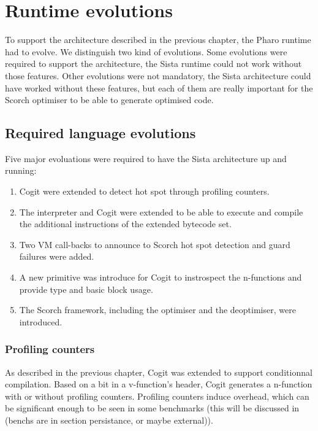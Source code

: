 \documentclass[a4paper,12pt,twoside]{../includes/ThesisStyle}
\begin{document}
\fi

\chapter{Runtime evolutions}
\label{chap:runtimeEvolution}
\minitoc

To support the architecture described in the previous chapter, the Pharo runtime had to evolve. We distinguish two kind of evolutions. Some evolutions were required to support the architecture, the Sista runtime could not work without those features. Other evolutions were not mandatory, the Sista architecture could have worked without these features, but each of them are really important for the Scorch optimiser to be able to generate optimised code.


\section{Required language evolutions}

Five major evoluations were required to have the Sista architecture up and running:
\begin{enumerate}
	\item Cogit were extended to detect hot spot through profiling counters.
	\item The interpreter and Cogit were extended to be able to execute and compile the additional instructions of the extended bytecode set.
	\item Two VM call-backs to announce to Scorch hot spot detection and guard failures were added.
	\item A new primitive was introduce for Cogit to instrospect the n-functions and provide type and basic block usage.
	\item The Scorch framework, including the optimiser and the deoptimiser, were introduced.
\end{enumerate}

\subsection{Profiling counters}

As described in the previous chapter, Cogit was extended to support conditionnal compilation. Based on a bit in a v-function's header, Cogit generates a n-function with or without profiling counters. Profiling counters induce overhead, which can be significant enough to be seen in some benchmarks (this will be discussed in (benchs are in section persistance, or maybe external)). 
\end{document}
